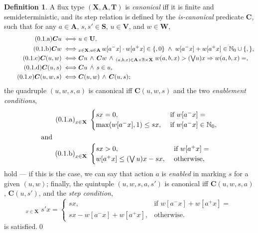\documentclass [a4paper,12pt] {article}
\theoremstyle{definition}
\newtheorem{definition}{Definition}[section]
\renewcommand{\theequation}{\arabic{section}.\arabic{equation}}
\newcommand{\Forall}{}
\DeclareRobustCommand{\Forall}{\mathop{\mathlarger{\forall}}}
\newcommand{\xbot}{}
\DeclareRobustCommand{\xbot}{\mathop{\textstyle\mathsmaller{\bm\bot}}}
\newcommand{\xtop}{}
\DeclareRobustCommand{\xtop}{\mathop{\textstyle\mathsmaller{\bm\top}}}
\begin{document}
\begin {definition}\label {def:canonical-consistency}
  A flux type $(\mathbf {X}, \mathbf {A}, \mathbf {T})$ is {\em
    canonical}\/ iff it is finite and semideterministic, and its step
  relation is defined by the {\em is-canonical}\/ predicate $\bm {C}$,
  such that for any $a \in \mathbf {A}$, $s, s' \in \mathbf {S}$, $u
  \in \mathbf {V}$, and $w \in \mathbf {W}$,
\begin {align}\label{eq:is-canonical}\stepcounter{equation}
  \tag{\theequation.a}
  \bm {C}u \iff &u \in \mathbf {U},\\
  \tag{\theequation.b}\label{eq:is-canonical-b}
  \bm {C}w \iff &\Forall_{x \in \mathbf {X}, a \in \mathbf {A}}\,w[a^-x] \cdot w[a^+x] \in \{\xbot, 0\}
  \;\land\; w[a^-x] + w[a^+x] \in \mathbb {N}_0 \cup \{ \xbot, \xtop \},\\
  \tag{\theequation.c}\label{eq:is-canonical-c}
  \bm {C}(u, w) \iff &\bm {C}u \,\land\, \bm {C}w \,\land\, \Forall_{(a, b, x) \in \mathbf {A}{\times}\mathbb {B}{\times}\mathbf {X} }\;%
  w(a,b,x) > (\mathsmaller{\bigvee}u)x \Rightarrow w(a,b,x) = \xtop,\\
  \tag{\theequation.d}\label{eq:is-canonical-d}
  \bm {C}(u, s) \iff &\bm {C}u \,\land\, s \in u,\\
  \tag{\theequation.e}\label{eq:is-canonical-e}
  \bm {C}(u, w, s) \iff &\bm {C}(u, w) \,\land\, \bm {C}(u, s);
\end {align}
%
the quadruple $(u, w, s, a)$ is canonical iff $\bm {C}(u, w, s)$ and
the two {\em enablement conditions}\/,
%
\begin {align}\label {eq:enablement-conditions}
  \tag{\theequation.a}
  \Forall_{x \in \mathbf {X}}\;&%
  \begin {cases}
    sx = 0, &\textrm { if } w[a^-x] = \xtop\\
    \max(w[a^-x],1) \leq sx, &\textrm { if } w[a^-x] \in \mathbb {N}_0,
  \end {cases}\\
  \intertext{and}
  \tag{\theequation.b}
  \Forall_{x \in \mathbf {X}}\;&%
  \begin {cases}
    sx > 0, &\textrm { if } w[a^+x] = \xtop\\
    w[a^+x] \leq (\bigvee u)x - sx, &\textrm { otherwise},
  \end {cases}
\end {align}
%
hold --- if this is the case, we can say that action $a$ is {\em
  enabled}\/ in marking $s$ for a given $(u, w)$; finally, the
quintuple $(u, w, s, a, s')$ is canonical iff $\bm {C}(u, w, s, a)$,
$\bm {C}(u, s')$, and the {\em step condition}\/,
%
\begin {equation}\label {eq:step-condition}
\Forall_{x \in \mathbf {X}}\; s'x =
\begin {cases}
sx,& \text {if } w[a^-x] + w[a^+x] = \xtop\\
sx - w[a^-x] + w[a^+x],& \text {otherwise.}
\end {cases}
\end {equation}
%
is satisfied.\qed
\end {definition}
\end{document}
